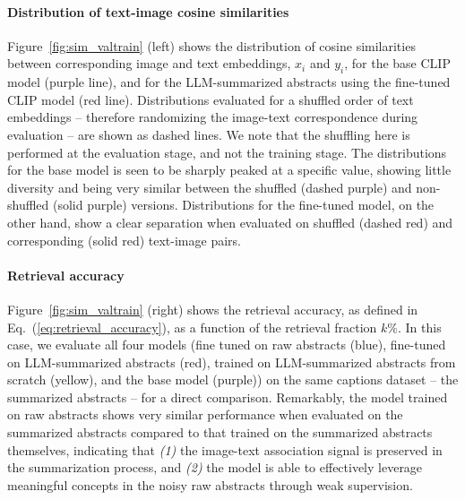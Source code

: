\documentclass[10pt]{article} %
\newcommand{\eqrefb}[1]{(\ref{#1})}
\begin{document}
\paragraph*{Distribution of text-image cosine similarities}

Figure~\ref{fig:sim_valtrain} (left) shows the distribution of cosine similarities between corresponding image and text embeddings, $x_i$ and $y_i$, for the base CLIP model (purple line), and for the LLM-summarized abstracts using the fine-tuned CLIP model (red line).
%
Distributions evaluated for a shuffled order of text embeddings -- therefore randomizing the image-text correspondence during evaluation -- are shown as dashed lines. We note that the shuffling here is performed at the evaluation stage, and not the training stage.
%
The distributions for the base model is seen to be sharply peaked at a specific value, showing little diversity and being very similar between the shuffled (dashed purple) and non-shuffled (solid purple) versions. 
%
Distributions for the fine-tuned model, on the other hand, show a clear separation when evaluated on shuffled (dashed red) and corresponding (solid red) text-image pairs.


\paragraph*{Retrieval accuracy}

Figure~\ref{fig:sim_valtrain} (right) shows the retrieval accuracy, as defined in Eq.~\eqrefb{eq:retrieval_accuracy}, as a function of the retrieval fraction $k\%$.
%
In this case, we evaluate all four models (fine tuned on raw abstracts (blue), fine-tuned on LLM-summarized abstracts (red), trained on LLM-summarized abstracts from scratch (yellow), and the base model (purple)) on the same captions dataset -- the summarized abstracts -- for a direct comparison.
%
Remarkably, the model trained on raw abstracts shows very similar performance when evaluated on the summarized abstracts compared to that trained on the summarized abstracts themselves, indicating that \emph{(1)} the image-text association signal is preserved in the summarization process, and \emph{(2)} the model is able to effectively leverage meaningful concepts in the noisy raw abstracts through weak supervision.
\end{document}

